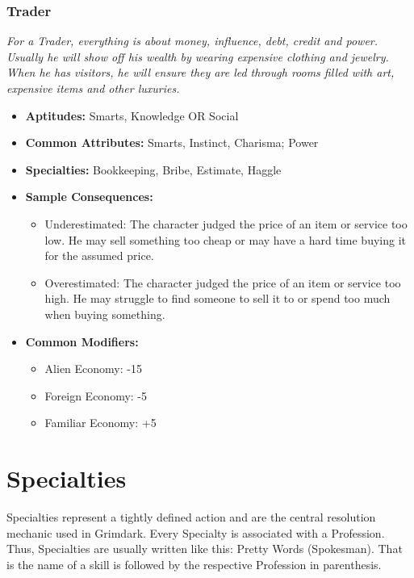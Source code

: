 \subsubsection{Trader}\label{Trader}
\textit{For a Trader, everything is about money, influence, debt, credit and power.
Usually he will show off his wealth by wearing expensive clothing and jewelry.
When he has visitors, he will ensure they are led through rooms filled with art, expensive items and other luxuries.}
\begin{itemize}
	\item \textbf{Aptitudes:} Smarts, Knowledge OR Social
	\item \textbf{Common Attributes:} Smarts, Instinct, Charisma; Power
	\item \textbf{Specialties:} Bookkeeping, Bribe, Estimate, Haggle
	\item \textbf{Sample Consequences:} 
	\begin{itemize}
		\item Underestimated: The character judged the price of an item or service too low. He may sell something too cheap or may have a hard time buying it for the assumed price.
		\item Overestimated: The character judged the price of an item or service too high. He may struggle to find someone to sell it to or spend too much when buying something.
	\end{itemize}
	\item \textbf{Common Modifiers:}
	\begin{itemize}
		\item Alien Economy: -15
		\item Foreign Economy: -5
		\item Familiar Economy: +5 
	\end{itemize}
\end{itemize}


\section{Specialties}%
\label{sec:Specialties}
Specialties represent a tightly defined action and are the central resolution mechanic used in Grimdark. 
Every Specialty is associated with a Profession.
Thus, Specialties are usually written like this: Pretty Words (Spokesman).
That is the name of a skill is followed by the respective Profession in parenthesis.


